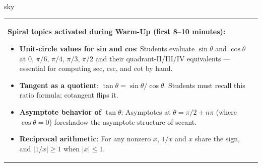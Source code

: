 \documentclass[10pt]{article}
\begin{document}
\begin{skillbox}{sky}
\begin{tabularx}{\linewidth}{@{}X c@{}}
\begin{minipage}[t]{0.96\linewidth}\vspace{0pt}
\textbf{Spiral topics activated during Warm-Up (first 8--10 minutes):}
\begin{itemize}[leftmargin=1.4em, itemsep=2pt]
  \item \textbf{Unit-circle values for sin and cos}: Students evaluate
    $\sin\theta$ and $\cos\theta$ at $0,\,\pi/6,\,\pi/4,\,\pi/3,\,\pi/2$
    and their quadrant-II/III/IV equivalents --- essential for computing
    sec, csc, and cot by hand.
  \item \textbf{Tangent as a quotient}: $\tan\theta = \sin\theta/\cos\theta$.
    Students must recall this ratio formula; cotangent flips it.
  \item \textbf{Asymptote behavior of $\tan\theta$}: Asymptotes at
    $\theta = \pi/2 + n\pi$ (where $\cos\theta = 0$) foreshadow the
    asymptote structure of secant.
  \item \textbf{Reciprocal arithmetic}: For any nonzero $x$, $1/x$ and $x$
    share the sign, and $|1/x| \geq 1$ when $|x| \leq 1$.
\end{itemize}
\end{minipage}
&
\end{tabularx}
\end{skillbox}

\vspace{0.08in}
\end{document}
